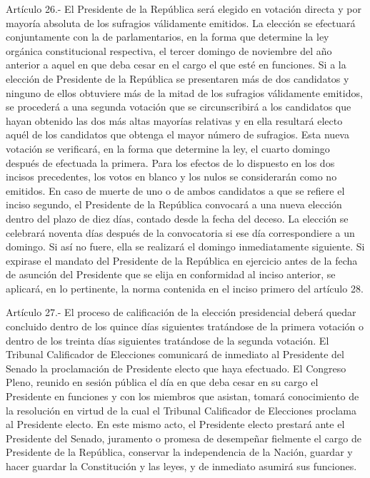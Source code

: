     Artículo 26.- El Presidente de la República será elegido en votación directa y por mayoría absoluta de los sufragios válidamente emitidos. La elección se efectuará conjuntamente con la de parlamentarios, en la forma que determine la ley orgánica constitucional respectiva, el tercer domingo de noviembre del año anterior a aquel en que deba cesar en el cargo el que esté en funciones.
    Si a la elección de Presidente de la República se presentaren más de dos candidatos y ninguno de ellos obtuviere más de la mitad de los sufragios válidamente emitidos, se procederá a una segunda votación que se circunscribirá a los candidatos que hayan obtenido las dos más altas mayorías relativas y en ella resultará electo aquél de los candidatos que obtenga el mayor número de sufragios. Esta nueva votación se verificará, en la forma que determine la ley, el cuarto domingo después de efectuada la primera.
    Para los efectos de lo dispuesto en los dos incisos precedentes, los votos en blanco y los nulos se considerarán como no emitidos.
    En caso de muerte de uno o de ambos candidatos a que se refiere el inciso segundo, el Presidente de la República convocará a una nueva elección dentro del plazo de diez días, contado desde la fecha del deceso. La elección se celebrará noventa días después de la convocatoria si ese día correspondiere a un domingo. Si así no fuere, ella se realizará el domingo inmediatamente siguiente.
    Si expirase el mandato del Presidente de la República en ejercicio antes de la fecha de asunción del Presidente que se elija en conformidad al inciso anterior, se aplicará, en lo pertinente, la norma contenida en el inciso primero del artículo 28.



    Artículo 27.- El proceso de calificación de la elección presidencial deberá quedar concluido dentro de los quince días siguientes tratándose de la primera votación o dentro de los treinta días siguientes tratándose de la segunda votación.
    El Tribunal Calificador de Elecciones comunicará de inmediato al Presidente del Senado la proclamación de Presidente electo que haya efectuado.
    El Congreso Pleno, reunido en sesión pública el día en que deba cesar en su cargo el Presidente en funciones y con los miembros que asistan, tomará conocimiento de la resolución en virtud de la cual el Tribunal Calificador de Elecciones proclama al Presidente electo.
    En este mismo acto, el Presidente electo prestará ante el Presidente del Senado, juramento o promesa de desempeñar fielmente el cargo de Presidente de la República, conservar la independencia de la Nación, guardar y hacer guardar la Constitución y las leyes, y de inmediato asumirá sus funciones.



